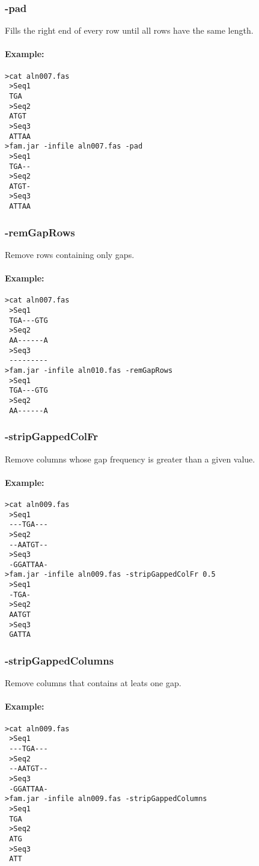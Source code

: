 \documentclass[a4paper, twoside,10pt]{article}
\begin{document}
\subsubsection{-pad}
Fills the right end of every row until all rows have the same length.
\paragraph{Example:}
\begin{verbatim}
>cat aln007.fas
 >Seq1
 TGA
 >Seq2
 ATGT
 >Seq3
 ATTAA
>fam.jar -infile aln007.fas -pad
 >Seq1
 TGA--
 >Seq2
 ATGT-
 >Seq3
 ATTAA
\end{verbatim}

\subsubsection{-remGapRows}
Remove rows containing only gaps.
\paragraph{Example:}
\begin{verbatim}
>cat aln007.fas
 >Seq1
 TGA---GTG
 >Seq2
 AA------A
 >Seq3
 ---------
>fam.jar -infile aln010.fas -remGapRows 
 >Seq1
 TGA---GTG
 >Seq2
 AA------A
\end{verbatim}


\subsubsection{-stripGappedColFr}
Remove columns whose gap frequency is greater than a given value.
\paragraph{Example:}
\begin{verbatim}
>cat aln009.fas
 >Seq1
 ---TGA---
 >Seq2
 --AATGT--
 >Seq3
 -GGATTAA-
>fam.jar -infile aln009.fas -stripGappedColFr 0.5
 >Seq1
 -TGA-
 >Seq2
 AATGT
 >Seq3
 GATTA
\end{verbatim}

\subsubsection{-stripGappedColumns}
Remove columns that contains at leats one gap.
\paragraph{Example:}
\begin{verbatim}
>cat aln009.fas
 >Seq1
 ---TGA---
 >Seq2
 --AATGT--
 >Seq3
 -GGATTAA-
>fam.jar -infile aln009.fas -stripGappedColumns 
 >Seq1
 TGA
 >Seq2
 ATG
 >Seq3
 ATT
\end{verbatim}
\end{document}
